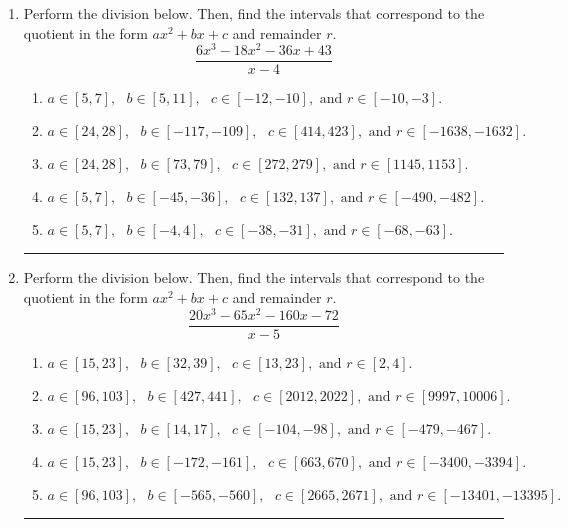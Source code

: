 \documentclass[14pt]{extbook}
\newcommand{\litem}[1]{\item#1\hspace*{-1cm}\rule{\textwidth}{0.4pt}}
\begin{document}
\begin{enumerate}
{\begin{enumerate}[label=\Alph*.]
\end{enumerate} }
\litem{
Perform the division below. Then, find the intervals that correspond to the quotient in the form $ax^2+bx+c$ and remainder $r$.\[ \frac{6x^{3} -18 x^{2} -36 x + 43}{x -4} \]\begin{enumerate}[label=\Alph*.]
\item \( a \in [5, 7], \text{   } b \in [5, 11], \text{   } c \in [-12, -10], \text{   and   } r \in [-10, -3]. \)
\item \( a \in [24, 28], \text{   } b \in [-117, -109], \text{   } c \in [414, 423], \text{   and   } r \in [-1638, -1632]. \)
\item \( a \in [24, 28], \text{   } b \in [73, 79], \text{   } c \in [272, 279], \text{   and   } r \in [1145, 1153]. \)
\item \( a \in [5, 7], \text{   } b \in [-45, -36], \text{   } c \in [132, 137], \text{   and   } r \in [-490, -482]. \)
\item \( a \in [5, 7], \text{   } b \in [-4, 4], \text{   } c \in [-38, -31], \text{   and   } r \in [-68, -63]. \)

\end{enumerate} }
\litem{
Perform the division below. Then, find the intervals that correspond to the quotient in the form $ax^2+bx+c$ and remainder $r$.\[ \frac{20x^{3} -65 x^{2} -160 x -72}{x -5} \]\begin{enumerate}[label=\Alph*.]
\item \( a \in [15, 23], \text{   } b \in [32, 39], \text{   } c \in [13, 23], \text{   and   } r \in [2, 4]. \)
\item \( a \in [96, 103], \text{   } b \in [427, 441], \text{   } c \in [2012, 2022], \text{   and   } r \in [9997, 10006]. \)
\item \( a \in [15, 23], \text{   } b \in [14, 17], \text{   } c \in [-104, -98], \text{   and   } r \in [-479, -467]. \)
\item \( a \in [15, 23], \text{   } b \in [-172, -161], \text{   } c \in [663, 670], \text{   and   } r \in [-3400, -3394]. \)
\item \( a \in [96, 103], \text{   } b \in [-565, -560], \text{   } c \in [2665, 2671], \text{   and   } r \in [-13401, -13395]. \)


\end{enumerate}}
\end{enumerate}
\end{document}
